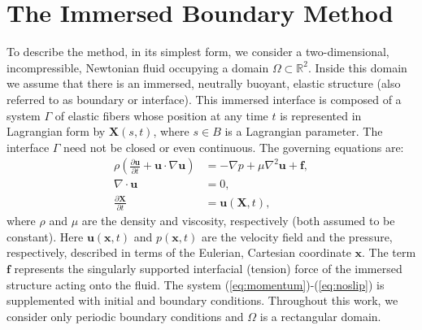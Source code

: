 \documentclass[preprint,12pt]{elsarticle}
\begin{document}
 \section{The Immersed Boundary Method}
 \label{Sec:IB}
To describe the method,  in its simplest form, we 
consider a two-dimensional, incompressible, Newtonian fluid occupying a domain $\Omega \subset \mathbb{R}^2$. Inside this domain
we assume that there is an immersed, neutrally buoyant, elastic structure (also referred to as boundary or interface). This immersed interface is composed of a system  $\Gamma$ of elastic fibers whose position at any time $t$ is represented in Lagrangian form by $\mathbf{X}(s,t)$, where $s \in B$ is a Lagrangian parameter. The interface $\Gamma$
need not be closed or even continuous. The governing equations are:
\begin{align}
\rho \left(\frac{\partial \mathbf{u}}{\partial t} + \mathbf{u}\cdot\nabla\mathbf{u} \right) &= -\nabla p + \mu\nabla^2 \mathbf{u} + \mathbf{f}, \label{eq:momentum}\\ 
\nabla \cdot \mathbf{u} &= 0, \label{eq:incompressibility}\\
\frac{\partial \mathbf{X}}{\partial t}  &= \mathbf{u}(\mathbf{X},t), \label{eq:noslip}
\end{align}
where $\rho$ and $\mu$ are the density and viscosity, respectively (both assumed to be constant). Here $\mathbf{u}(\mathbf{x},t)$ and $p(\mathbf{x},t)$ are the velocity field and the pressure, respectively, described in terms of the Eulerian, Cartesian coordinate $\mathbf{x}$. The term $\mathbf{f}$ represents the singularly supported interfacial (tension) force of the immersed structure acting onto the fluid. The system (\ref{eq:momentum})-(\ref{eq:noslip}) is supplemented with initial and boundary conditions. Throughout this work, we consider only periodic boundary conditions and $\Omega$ is a rectangular domain.
\end{document}
